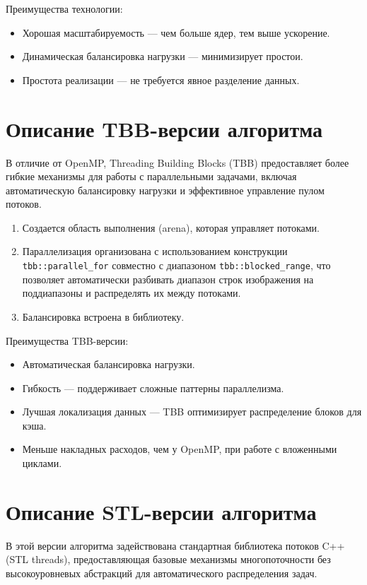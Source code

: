 \documentclass[a4paper,12pt]{article}
\begin{document}
Преимущества технологии:
\begin{itemize}
    \item Хорошая масштабируемость — чем больше ядер, тем выше ускорение.
    \item Динамическая балансировка нагрузки — минимизирует простои.
    \item Простота реализации — не требуется явное разделение данных.
\end{itemize}

\section*{Описание TBB-версии алгоритма}
В отличие от OpenMP, Threading Building Blocks (TBB) предоставляет более гибкие механизмы для работы с параллельными задачами, включая автоматическую балансировку нагрузки и эффективное управление пулом потоков.

\begin{enumerate}
    \item Создается область выполнения (arena), которая управляет потоками.
    \item Параллелизация организована с использованием конструкции \texttt{tbb::parallel\_for} совместно с диапазоном \texttt{tbb::blocked\_range}, что позволяет автоматически разбивать диапазон строк изображения на поддиапазоны и распределять их между потоками.
    \item Балансировка встроена в библиотеку.
\end{enumerate}

Преимущества TBB-версии:
\begin{itemize}
    \item Автоматическая балансировка нагрузки.
    \item Гибкость — поддерживает сложные паттерны параллелизма.
    \item Лучшая локализация данных — TBB оптимизирует распределение блоков для кэша.
    \item Меньше накладных расходов, чем у OpenMP, при работе с вложенными циклами.
\end{itemize}

\section*{Описание STL-версии алгоритма}
В этой версии алгоритма задействована стандартная библиотека потоков C++ (STL threads), предоставляющая базовые механизмы многопоточности без высокоуровневых абстракций для автоматического распределения задач.
\end{document}
